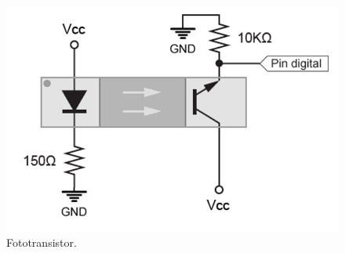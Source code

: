 \documentclass[a4paper,11pt]{report}    %
\begin{document}
\begin{figure}[H]
    \centering
    \includegraphics[width=0.6\linewidth]{img/image11.png}
    \caption{Fototransistor.}
    \label{fig:transistor-corte}
\end{figure}
\end{document}
